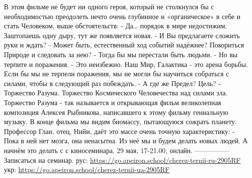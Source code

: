 В этом фильме не будет ни одного героя, который не столкнулся бы с необходимостью преодолеть нечто очень глубинное и «органическое» в себе и стать Человеком, выше обстоятельств:
- Да… порядок в мире недостижим. Заштопаешь одну дыру, тут же появляется новая.
- И Вы предлагаете сложить руки и ждать?
- Может быть, естественный ход событий  надёжнее? Покориться Природе и следовать за нею?
- Тогда бы мы перестали быть людьми.
- Но вы терпите и поражения.
- Это неизбежно. Наш Мир, Галактика - это арена борьбы. Если бы мы не терпели поражения, мы не могли бы научиться собраться с силами, чтобы в следующий раз побеждать.
- А где же Предел? Цель?
- Торжество Разума. Торжество Космического Человечества над силами зла.
Торжество Разума - так называется и открывающая фильм великолепная композиция Алексея Рыбникова, написавшего к этому фильму гениальную музыку.
В конце фильма мы видим биомассу, пытающуюся сожрать планету.
Профессор Глан, отец, Нийи, даёт это массе очень точную характеристику:
- Пока в ней нет мозга, она ненасытна. Из неё мы и будем делать новых людей.
А начнём это делать с с киносеминара, 29 мая, 17-21.00, онлайн. 
—————
Записаться на семинар. 
рус:
\url{https://go.apeiron.school/cherez-ternii-ru-2905RF}
укр:
\url{https://go.apeiron.school/cherez-ternii-ua-2905RF}
